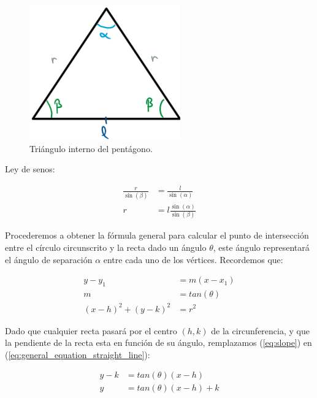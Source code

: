 \documentclass[oneside, a4paper]{article}
\begin{document}
            \begin{figure}[H]
                \centering
                \includegraphics[scale=0.5]{internal_triangle.png}
                \caption{Triángulo interno del pentágono.}
                \label{fig:internal_triangle}
            \end{figure}

            Ley de senos:

            \begin{align}
                \frac{r}{\sin(\beta)} & = \frac{l}{\sin(\alpha)} \nonumber  \\
                r                     & = l\frac{\sin(\alpha)}{\sin(\beta)}
                \label{eq:radius_circumscribed_circle}
            \end{align}

            Procederemos a obtener la fórmula general para calcular el punto de intersección entre el círculo circunscrito y la recta dado un ángulo $\theta$, este ángulo representará el ángulo de separación $\alpha$ entre cada uno de los vértices. Recordemos que:

            \begin{align}
                y - y_{1}             & = m(x - x_{1}) \label{eq:general_equation_straight_line} \\
                m                     & = tan(\theta) \label{eq:slope}                           \\
                (x - h)^2 + (y - k)^2 & = r^2 \label{eq:general_equation_circle}
            \end{align}

            Dado que cualquier recta pasará por el centro $(h, k)$ de la circunferencia, y que la pendiente de la recta esta en función de su ángulo, remplazamos (\ref{eq:slope}) en (\ref{eq:general_equation_straight_line}):

            \begin{align}
                y - k & = tan(\theta)(x - h) \nonumber                                     \\
                y     & = tan(\theta)(x - h) + k \label{eq:straight_line_in_center_circle}
            \end{align}
\end{document}
